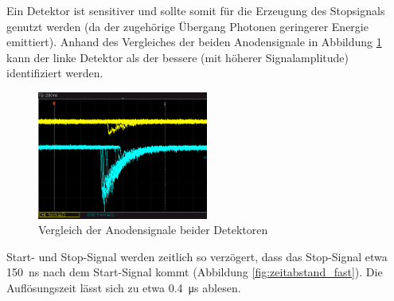 Ein Detektor ist sensitiver und sollte somit für die Erzeugung des Stopsignals genutzt werden (da der zugehörige Übergang Photonen geringerer Energie emittiert). Anhand des Vergleiches der beiden Anodensignale in Abbildung \ref{fig:detektorvergleich} kann der linke Detektor als der bessere (mit höherer Signalamplitude) identifiziert werden. \newpage
\begin{figure}[h]
  \centering
  \includegraphics[width=0.5\textwidth]{data/oszi/detektorvergleich.png}
  \caption{Vergleich der Anodensignale beider Detektoren}
  \label{fig:detektorvergleich}
\end{figure}

Start- und Stop-Signal werden zeitlich so verzögert, dass das Stop-Signal etwa \SI{150}{\nano\second} nach dem Start-Signal kommt (Abbildung \ref{fig:zeitabstand_fast}). Die Auflösungszeit lässt sich zu etwa \SI{0.4}{\micro\second} ablesen.


